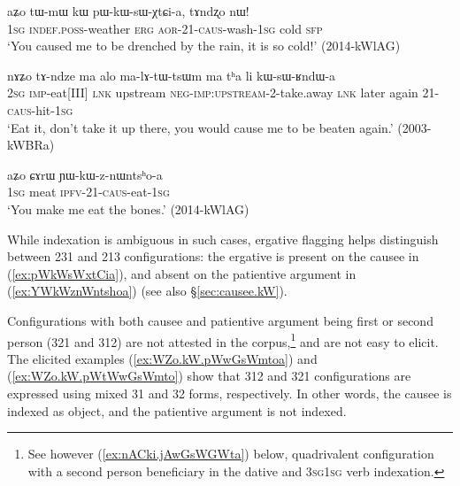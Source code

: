 \begin{exe}
	\ex \label{ex:pWkWsWxtCia}
	\gll  aʑo tɯ-mɯ kɯ pɯ-kɯ-sɯ-χtɕi-a, tɤndʐo nɯ! \\
	\textsc{1sg} \textsc{indef}.\textsc{poss}-weather \textsc{erg} \textsc{aor}-2\fl{}1-\textsc{caus}-wash-\textsc{1sg} cold \textsc{sfp} \\
	\glt `You caused me to be drenched by the rain, it is so cold!' (2014-kWlAG)
\end{exe}

\begin{exe}
	\ex \label{ex:kWsWRndWa}
	\gll  nɤʑo tɤ-ndze ma alo ma-lɤ-tɯ-tsɯm ma tʰa li kɯ-sɯ-ʁndɯ-a \\
	\textsc{2sg} \textsc{imp}-eat[III] \textsc{lnk} upstream \textsc{neg}-\textsc{imp}:\textsc{upstream}-2-take.away \textsc{lnk} later again 2\fl{}1-\textsc{caus}-hit-\textsc{1sg} \\
	\glt  `Eat it, don't take it up there, you would cause me to be beaten again.' (2003-kWBRa)
\end{exe}

\begin{exe}
	\ex \label{ex:YWkWznWntshoa}
	\gll aʑo ɕɤrɯ ɲɯ-kɯ-z-nɯntsʰo-a \\
	\textsc{1sg} meat \textsc{ipfv}-2\fl{}1-\textsc{caus}-eat-\textsc{1sg} \\
	\glt `You make me eat the bones.' (2014-kWlAG)
\end{exe}

While indexation is ambiguous in such cases, ergative flagging helps distinguish between 2\fl{}3\fl{}1  and 2\fl{}1\fl{}3 configurations: the ergative is present on the causee in (\ref{ex:pWkWsWxtCia}), and absent on the patientive argument in (\ref{ex:YWkWznWntshoa}) (see also §\ref{sec:causee.kW}).


Configurations with both causee and patientive argument being first or second person (3\fl{}2\fl{}1 and 3\fl{}1\fl{}2) are not attested in the corpus,\footnote{See however (\ref{ex:nACki.jAwGsWGWta}) below, quadrivalent configuration with a second person beneficiary in the dative and 3\textsc{sg}\fl{}1\textsc{sg} verb indexation.} and are not easy to elicit. The elicited examples (\ref{ex:WZo.kW.pWwGsWmtoa}) and (\ref{ex:WZo.kW.pWtWwGsWmto}) show that 3\fl{}1\fl{}2 and 3\fl{}2\fl{}1 configurations are expressed using mixed 3\fl{}1 and 3\fl{}2 forms, respectively. In other words, the causee is indexed as object, and the patientive argument is not indexed.

